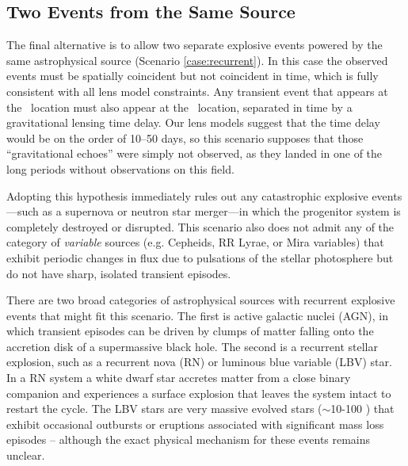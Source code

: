 


\subsection{Two Events from the Same Source}

The final alternative is to allow two separate explosive events
powered by the same astrophysical source (Scenario
\ref{case:recurrent}).  In this case the observed events must be
spatially coincident but not coincident in time, which is fully
consistent with all lens model constraints.  Any transient event that
appears at the \spockone\ location must also appear at the
\spocktwo\ location, separated in time by a gravitational lensing time
delay.  Our lens models suggest that the time delay would be on the
order of 10--50 days, so this scenario supposes that those
``gravitational echoes'' were simply not observed, as they landed in
one of the long periods without \HST observations on this field.

Adopting this hypothesis immediately rules out any catastrophic
explosive events---such as a supernova or neutron star merger---in
which the progenitor system is completely destroyed or disrupted. This
scenario also does not admit any of the category of {\it variable}
sources (e.g. Cepheids, RR Lyrae, or Mira variables) that exhibit
periodic changes in flux due to pulsations of the stellar photosphere
but do not have sharp, isolated transient episodes.

There are two broad categories of astrophysical sources with
recurrent explosive events that might fit this scenario.  The first is
active galactic nuclei (AGN), in which transient episodes can be
driven by clumps of matter falling onto the accretion disk of a
supermassive black hole.  The second is a recurrent stellar explosion,
such as a recurrent nova (RN) or luminous blue variable (LBV) star.
In a RN system a white dwarf star accretes matter from a close binary
companion and experiences a surface explosion that leaves the system
intact to restart the cycle.  The LBV stars are very massive evolved
stars ($\sim$10-100 \Msun) that exhibit occasional outbursts or
eruptions associated with significant mass loss episodes -- although
the exact physical mechanism for these events remains unclear.

